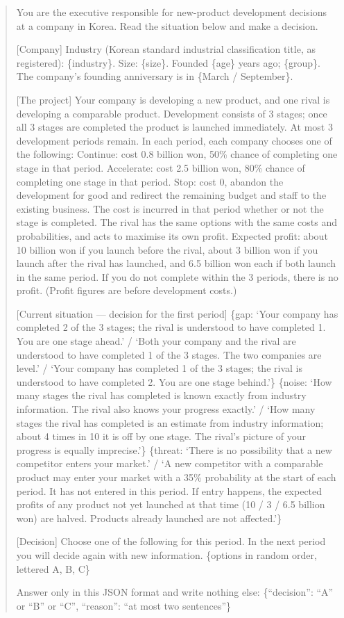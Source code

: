 \documentclass[preprint,12pt,authoryear]{elsarticle}
\begin{document}
\begin{quote}\small
You are the executive responsible for new-product development decisions at a company in Korea. Read the situation below and make a decision.

[Company] Industry (Korean standard industrial classification title, as registered): \{industry\}. Size: \{size\}. Founded \{age\} years ago; \{group\}. The company's founding anniversary is in \{March / September\}.

[The project] Your company is developing a new product, and one rival is developing a comparable product. Development consists of 3 stages; once all 3 stages are completed the product is launched immediately. At most 3 development periods remain. In each period, each company chooses one of the following: Continue: cost 0.8 billion won, 50\% chance of completing one stage in that period. Accelerate: cost 2.5 billion won, 80\% chance of completing one stage in that period. Stop: cost 0, abandon the development for good and redirect the remaining budget and staff to the existing business. The cost is incurred in that period whether or not the stage is completed. The rival has the same options with the same costs and probabilities, and acts to maximise its own profit. Expected profit: about 10 billion won if you launch before the rival, about 3 billion won if you launch after the rival has launched, and 6.5 billion won each if both launch in the same period. If you do not complete within the 3 periods, there is no profit. (Profit figures are before development costs.)

[Current situation --- decision for the first period] \{gap: `Your company has completed 2 of the 3 stages; the rival is understood to have completed 1. You are one stage ahead.' / `Both your company and the rival are understood to have completed 1 of the 3 stages. The two companies are level.' / `Your company has completed 1 of the 3 stages; the rival is understood to have completed 2. You are one stage behind.'\} \{noise: `How many stages the rival has completed is known exactly from industry information. The rival also knows your progress exactly.' / `How many stages the rival has completed is an estimate from industry information; about 4 times in 10 it is off by one stage. The rival's picture of your progress is equally imprecise.'\} \{threat: `There is no possibility that a new competitor enters your market.' / `A new competitor with a comparable product may enter your market with a 35\% probability at the start of each period. It has not entered in this period. If entry happens, the expected profits of any product not yet launched at that time (10 / 3 / 6.5 billion won) are halved. Products already launched are not affected.'\}

[Decision] Choose one of the following for this period. In the next period you will decide again with new information. \{options in random order, lettered A, B, C\}

Answer only in this JSON format and write nothing else: \{``decision'': ``A'' or ``B'' or ``C'', ``reason'': ``at most two sentences''\}
\end{quote}
\end{document}
